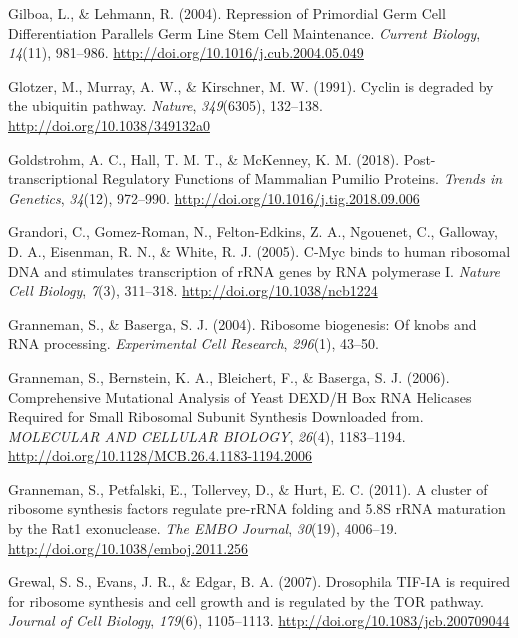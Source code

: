 \documentclass[12pt,twoside]{reedthesis}
\newlength{\cslhangindent}
\newenvironment{cslreferences}%
  {\setlength{\parindent}{0pt}%
  \everypar{\setlength{\hangindent}{\cslhangindent}}\ignorespaces}%
  {\par}
\begin{document}
\begin{cslreferences}
\leavevmode\hypertarget{ref-Gilboa2004a}{}%
Gilboa, L., \& Lehmann, R. (2004). Repression of Primordial Germ Cell Differentiation Parallels Germ Line Stem Cell Maintenance. \emph{Current Biology}, \emph{14}(11), 981--986. \url{http://doi.org/10.1016/j.cub.2004.05.049}

\leavevmode\hypertarget{ref-glotzerCyclinDegradedUbiquitin1991}{}%
Glotzer, M., Murray, A. W., \& Kirschner, M. W. (1991). Cyclin is degraded by the ubiquitin pathway. \emph{Nature}, \emph{349}(6305), 132--138. \url{http://doi.org/10.1038/349132a0}

\leavevmode\hypertarget{ref-Goldstrohm2018c}{}%
Goldstrohm, A. C., Hall, T. M. T., \& McKenney, K. M. (2018). Post-transcriptional Regulatory Functions of Mammalian Pumilio Proteins. \emph{Trends in Genetics}, \emph{34}(12), 972--990. \url{http://doi.org/10.1016/j.tig.2018.09.006}

\leavevmode\hypertarget{ref-grandoriCMycBindsHuman2005}{}%
Grandori, C., Gomez-Roman, N., Felton-Edkins, Z. A., Ngouenet, C., Galloway, D. A., Eisenman, R. N., \& White, R. J. (2005). C-Myc binds to human ribosomal DNA and stimulates transcription of rRNA genes by RNA polymerase I. \emph{Nature Cell Biology}, \emph{7}(3), 311--318. \url{http://doi.org/10.1038/ncb1224}

\leavevmode\hypertarget{ref-Granneman2004a}{}%
Granneman, S., \& Baserga, S. J. (2004). Ribosome biogenesis: Of knobs and RNA processing. \emph{Experimental Cell Research}, \emph{296}(1), 43--50.

\leavevmode\hypertarget{ref-Granneman2006}{}%
Granneman, S., Bernstein, K. A., Bleichert, F., \& Baserga, S. J. (2006). Comprehensive Mutational Analysis of Yeast DEXD/H Box RNA Helicases Required for Small Ribosomal Subunit Synthesis Downloaded from. \emph{MOLECULAR AND CELLULAR BIOLOGY}, \emph{26}(4), 1183--1194. \url{http://doi.org/10.1128/MCB.26.4.1183-1194.2006}

\leavevmode\hypertarget{ref-Granneman2011}{}%
Granneman, S., Petfalski, E., Tollervey, D., \& Hurt, E. C. (2011). A cluster of ribosome synthesis factors regulate pre-rRNA folding and 5.8S rRNA maturation by the Rat1 exonuclease. \emph{The EMBO Journal}, \emph{30}(19), 4006--19. \url{http://doi.org/10.1038/emboj.2011.256}

\leavevmode\hypertarget{ref-Grewal2007c}{}%
Grewal, S. S., Evans, J. R., \& Edgar, B. A. (2007). Drosophila TIF-IA is required for ribosome synthesis and cell growth and is regulated by the TOR pathway. \emph{Journal of Cell Biology}, \emph{179}(6), 1105--1113. \url{http://doi.org/10.1083/jcb.200709044}


\end{cslreferences}
\end{document}
